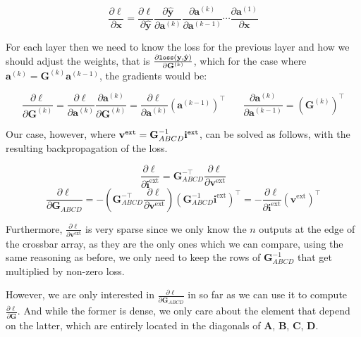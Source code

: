 \documentclass[journal,onecolumn]{IEEEtran}
\newcommand{\vtt}[1]{%
  \text{\normalfont\ttfamily\detokenize{#1}}%
}
\begin{document}
    $$\frac{\partial \ell}{\partial \mathbf{x}} = \frac{\partial \ell}{\partial \hat{\mathbf{y}}} \frac{\partial \hat{\mathbf{y}}}{\partial \mathbf{a}^{(k)}} \frac{\partial \mathbf{a}^{(k)}}{\partial \mathbf{a}^{(k-1)}} \cdots \frac{\partial \mathbf{a}^{(1)}}{\partial \mathbf{x}}$$
    
    For each layer then we need to know the loss for the previous layer and how we should adjust the weights, that is $\frac{\partial \vtt{loss}(\mathbf{y},\hat{\mathbf{y}})}{\partial \mathbf{G}^{(k)}}$, which for the case where $\mathbf{a}^{(k)} = \mathbf{G}^{(k)}\mathbf{a}^{(k-1)}$, the gradients would be:
    
    $$\frac{\partial \ell}{\partial \mathbf{G}^{(k)}} = \frac{\partial \ell}{\partial \mathbf{a}^{(k)}} \frac{\partial \mathbf{a}^{(k)}}{\partial \mathbf{G}^{(k)}} = \frac{\partial \ell}{\partial \mathbf{a}^{(k)}} (\mathbf{a}^{(k-1)})^\top~~~~~~~~\frac{\partial \mathbf{a}^{(k)}}{\partial \mathbf{a}^{(k-1)}} = (\mathbf{G}^{(k)})^\top$$
    
    Our case, however, where $\mathbf{v}^\vtt{ext} = \mathbf{G}^{-1}_{ABCD}\mathbf{i}^\vtt{ext}$, can be solved as follows, with the resulting backpropagation of the loss.

    $$ %
        \frac{\partial \ell}{\partial \mathbf{i}^\text{ext}} = \mathbf{G}^{-\top}_{ABCD} \frac{\partial \ell}{\partial \mathbf{v}^\text{ext}}  %
    $$
    $$
        \frac{\partial \ell}{\partial \mathbf{G}^{}_{ABCD}} = -\left( \mathbf{G}^{-\top}_{ABCD}\frac{\partial \ell}{\partial \mathbf{v}^\text{ext}}\right)\left(\mathbf{G}^{-1}_{ABCD}\mathbf{i}^\text{ext} \right)^\top = -\frac{\partial \ell}{\partial \mathbf{i}^\text{ext}}(\mathbf{v}^\text{ext})^\top
    $$ %
    
    Furthermore, $\frac{\partial \ell}{\partial \mathbf{v}^\text{ext}}$ is very sparse since we only know the $n$ outputs at the edge of the crossbar array, as they are the only ones which we can compare, using the same reasoning as before, we only need to keep the rows of $\mathbf{G}^{-1}_{ABCD}$ that get multiplied by non-zero loss. %
    
    However, we are only interested in $\frac{\partial \ell}{\partial \mathbf{G}^{}_{ABCD}}$ in so far as we can use it to compute $\frac{\partial \ell}{\partial \mathbf{G}}$. And while the former is dense, we only care about the element that depend on the latter, which are entirely located in the diagonals of $\mathbf{A}$, $\mathbf{B}$, $\mathbf{C}$, $\mathbf{D}$.
    
\end{document}
